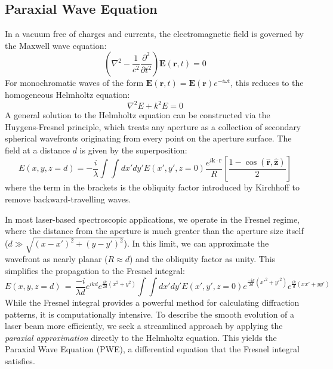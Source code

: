 \subsection{Paraxial Wave Equation}
In a vacuum free of charges and currents, the electromagnetic field is governed by the Maxwell wave equation:
\begin{equation}
	\left(\nabla^2 - \frac{1}{c^2}\frac{\partial^2}{\partial t^2}\right)\mathbf{E}(\mathbf{r}, t) = 0
\end{equation}
For monochromatic waves of the form $\mathbf{E}(\mathbf{r},t) = \mathbf{E}(\mathbf{r})e^{-i\omega t}$, this reduces to the homogeneous Helmholtz equation:
\begin{equation} \label{helmholtz}
	\nabla^2 E + k^2 E = 0
\end{equation}
A general solution to the Helmholtz equation can be constructed via the Huygens-Fresnel principle, which treats any aperture as a collection of secondary spherical wavefronts originating from every point on the aperture surface. The field at a distance $d$ is given by the superposition:
\begin{equation}
	E(x,y,z=d) = -\frac{i}{\lambda}\int\int dx' dy' E(x',y',z=0) \frac{e^{i\mathbf{k}\cdot\mathbf{r}}}{R} \left[ \frac{1-\cos(\mathbf{\hat{r}},\mathbf{\hat{z}})}{2}\right]
\end{equation}
where the term in the brackets is the obliquity factor introduced by Kirchhoff to remove backward-travelling waves.

In most laser-based spectroscopic applications, we operate in the Fresnel regime, where the distance from the aperture is much greater than the aperture size itself ($d \gg \sqrt{(x-x')^2 + (y-y')^2}$). In this limit, we can approximate the wavefront as nearly planar ($R \approx d$) and the obliquity factor as unity. This simplifies the propagation to the Fresnel integral:
\begin{equation} \label{fresnel_integral}
	E(x,y,{z=d}) \,=\, \frac{-i}{\lambda d}e^{ikd} e^{\frac{ik}{2d}(x^2+y^2)}\int\int dx' dy' E(x',y',z=0) e^{\frac{-ik}{2d} (x'^2 + y'^2)} e^{\frac{ik}{d} (x x' + y y')}
\end{equation}
While the Fresnel integral provides a powerful method for calculating diffraction patterns, it is computationally intensive. To describe the smooth evolution of a laser beam more efficiently, we seek a streamlined approach by applying the \textit{paraxial approximation} directly to the Helmholtz equation. This yields the Paraxial Wave Equation (PWE), a differential equation that the Fresnel integral satisfies.

